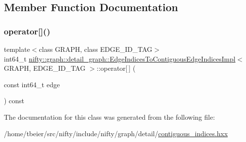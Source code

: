 \subsection{Member Function Documentation}
\mbox{\label{classnifty_1_1graph_1_1detail__graph_1_1EdgeIndicesToContiguousEdgeIndicesImpl_ae161e5dfac99c6d9109450aac9a891ac}} 
\subsubsection{\texorpdfstring{operator[]()}{operator[]()}}
{\footnotesize\ttfamily template$<$class G\+R\+A\+PH, class E\+D\+G\+E\+\_\+\+I\+D\+\_\+\+T\+AG$>$ \\
int64\+\_\+t \hyperlink{classnifty_1_1graph_1_1detail__graph_1_1EdgeIndicesToContiguousEdgeIndicesImpl}{nifty\+::graph\+::detail\+\_\+graph\+::\+Edge\+Indices\+To\+Contiguous\+Edge\+Indices\+Impl}$<$ G\+R\+A\+PH, E\+D\+G\+E\+\_\+\+I\+D\+\_\+\+T\+AG $>$\+::operator\mbox{[}$\,$\mbox{]} (\begin{DoxyParamCaption}\item[{const int64\+\_\+t}]{edge }\end{DoxyParamCaption}) const\hspace{0.3cm}{\ttfamily [inline]}}



The documentation for this class was generated from the following file\+:\begin{DoxyCompactItemize}
\item 
/home/tbeier/src/nifty/include/nifty/graph/detail/\hyperlink{contiguous__indices_8hxx}{contiguous\+\_\+indices.\+hxx}\end{DoxyCompactItemize}
